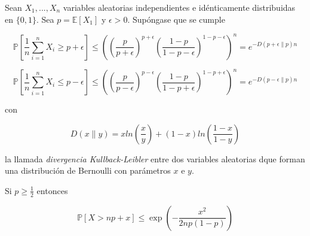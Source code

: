 \begin{teorema}

Sean $X_1,...,X_n$ variables aleatorias independientes e idénticamente distribuidas en $\{0,1\}$. Sea $p = \mathbb{E}[X_1]$ y $\epsilon>0$. Supóngase que se cumple

$$\mathbb{P} \left[ \frac{1}{n} \sum_{i=1}^n X_i \geq p+\epsilon \right] \leq \left( \left( \frac{p}{p+\epsilon} \right)^{p+\epsilon} \left( \frac{1-p}{1-p-\epsilon} \right)^{1-p-\epsilon} \right)^n = e^{-D(p+\epsilon\|p)n}$$

$$\mathbb{P} \left[ \frac{1}{n} \sum_{i=1}^n X_i \leq p-\epsilon \right] \leq \left( \left( \frac{p}{p-\epsilon} \right)^{p-\epsilon} \left( \frac{1-p}{1-p+\epsilon} \right)^{1-p+\epsilon} \right)^n = e^{-D(p-\epsilon \| p)n}$$

con 

$$D(x \| y)=x ln(\frac{x}{y}) + (1-x)ln \left( \frac{1-x}{1-y} \right)$$

la llamada \textit{divergencia Kullback-Leibler} entre dos variables aleatorias dque forman una distribución de Bernoulli con parámetros $x$ e $y$.

Si $p\geq \frac{1}{2}$ entonces

$$\mathbb{P} \left[ X > np+x \right] \leq \exp \left( - \frac{x^2}{2np(1-p)} \right)$$

\end{teorema}

